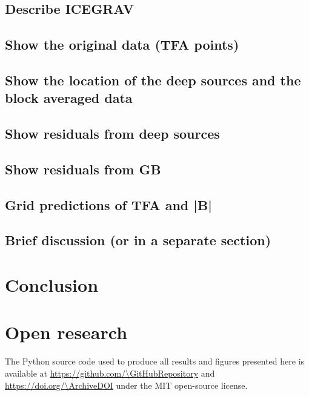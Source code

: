 \subsection{Describe ICEGRAV}

\subsection{Show the original data (TFA points)}

\subsection{Show the location of the deep sources and the block averaged data}

\subsection{Show residuals from deep sources}

\subsection{Show residuals from GB}

\subsection{Grid predictions of TFA and |B|}

\subsection{Brief discussion (or in a separate section)}



\section{Conclusion}

\lipsum[1]


\section{Open research}

The Python source code used to produce all results and figures presented here
is available at \url{https://github.com/\GitHubRepository} and
\url{https://doi.org/\ArchiveDOI} under the MIT open-source license.

